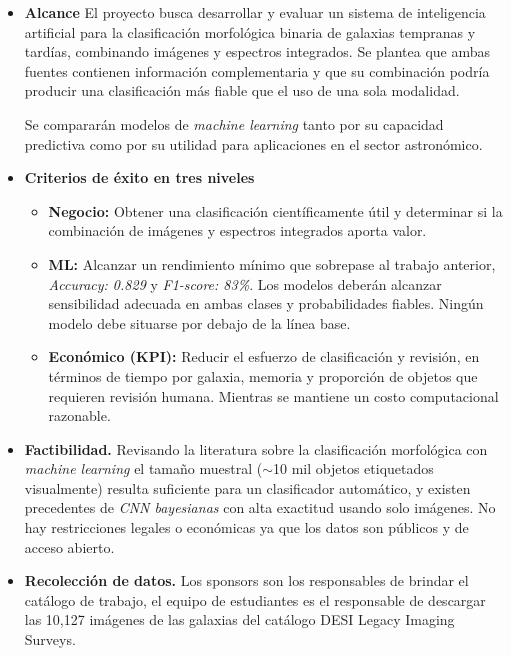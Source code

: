 \documentclass[12pt]{article}
\begin{document}
\begin{itemize}
    \item \textbf{Alcance}
    El proyecto busca desarrollar y evaluar un sistema de inteligencia artificial para la clasificación morfológica binaria de galaxias tempranas y tardías, combinando imágenes y espectros integrados. Se plantea que ambas fuentes contienen información complementaria y que su combinación podría producir una clasificación más fiable que el uso de una sola modalidad.

    Se compararán modelos de \textit{machine learning} tanto por su capacidad predictiva como por su utilidad para aplicaciones en el sector astronómico.
    \item \textbf{Criterios de éxito en tres niveles}

    \begin{itemize}
        \item \textbf{Negocio:}
        Obtener una clasificación científicamente útil y determinar si la combinación de imágenes y espectros integrados aporta valor.
        \item \textbf{ML:}
        Alcanzar un rendimiento mínimo que sobrepase al trabajo anterior, \textit{Accuracy: 0.829} y \textit{F1-score: 83\%}. Los modelos deberán alcanzar sensibilidad adecuada en ambas clases y probabilidades fiables. Ningún modelo debe situarse por debajo de la línea base.
        \item \textbf{Económico (KPI):}
        Reducir el esfuerzo de clasificación y revisión, en términos de tiempo por galaxia, memoria y proporción de objetos que requieren revisión humana. Mientras se mantiene un costo computacional razonable.
    \end{itemize}

    \item \textbf{Factibilidad.}
    Revisando la literatura sobre la clasificación morfológica con \textit{machine learning} el tamaño muestral ($\sim$10 mil objetos etiquetados visualmente) resulta suficiente para un clasificador automático, y existen precedentes de \textit{CNN bayesianas} con alta exactitud usando solo imágenes. No hay restricciones legales o económicas ya que los datos son públicos y de acceso abierto.
    \item \textbf{Recolección de datos.}
    Los sponsors son los responsables de brindar el catálogo de trabajo, el equipo de estudiantes es el responsable de descargar las 10,127 imágenes de las galaxias del catálogo DESI Legacy Imaging Surveys.


\end{itemize}
\end{document}
